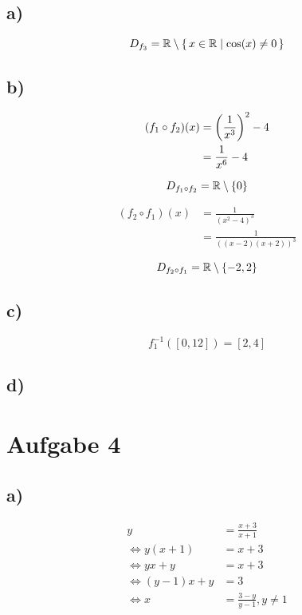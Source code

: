 \documentclass[a4paper, 11pt]{article}
\begin{document}
\subsection{a)}
\label{sec:orga21d949}
$$ D_{f_3} = \mathbb{R} \setminus \set{x \in \mathbb{R}| \cos(x) \neq 0} $$

\subsection{b)}
\label{sec:org4385dcc}
\begin{align*}
    (f_1 \circ f_2)(x) &= \left(\frac{1}{x^3}\right)^2 - 4 \\
    &= \frac{1}{x^6} - 4
\end{align*}

$$ D_{f_1 \circ f_2} = \mathbb{R} \setminus \{0\} $$

\begin{align*}
    (f_2 \circ f_1)(x) &= \frac{1}{(x^2 - 4)^3} \\
    &= \frac{1}{((x - 2)(x + 2))^3}
\end{align*}

$$ D_{f_2 \circ f_1} = \mathbb{R} \setminus \{-2, 2\} $$

\subsection{c)}
\label{sec:orgd131fc5}
$$ f_{1}^{-1}([0, 12]) = [2, 4] $$

\subsection{d)}
\label{sec:orga793ef1}
\section{Aufgabe 4}
\label{sec:org58b0703}
\subsection{a)}
\label{sec:org7a5f744}
\begin{align*}
    y &= \frac{x+3}{x+1} \\
    \Leftrightarrow y(x+1) &= x+3 \\
    \Leftrightarrow yx+y &= x+3 \\
    \Leftrightarrow (y-1)x+y &= 3 \\
    \Leftrightarrow x &= \frac{3-y}{y-1}, y \neq 1 \\
\end{align*}
\end{document}
